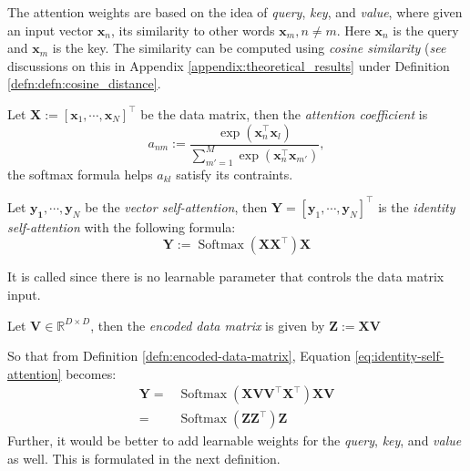 The attention weights are based on the idea of \textit{query}, \textit{key}, and \textit{value}, where given an input vector $\mathbf{x}_n$, its similarity to other words $\mathbf{x}_m,n\neq m$. Here $\mathbf{x}_n$ is the query and $\mathbf{x}_m$ is the key. The similarity can be computed using \textit{cosine similarity} (\textit{see} discussions on this in Appendix \ref{appendix:theoretical_results} under Definition \ref{defn:defn:cosine_distance}.
\begin{defn}
    Let $\mathbf{X}:=[\mathbf{x}_1,\cdots,\mathbf{x}_N]^{\top}$ be the data matrix, then the \textit{attention coefficient} is
    \begin{equation}
        a_{nm}:=\frac{\exp(\mathbf{x}_n^{\top}\mathbf{x}_l)}{\displaystyle\sum_{m'=1}^{M}\exp(\mathbf{x}_n^{\top}\mathbf{x}_{m'})},
    \end{equation}
    the softmax formula helps $a_{kl}$ satisfy its contraints.
\end{defn}
\begin{defn}
    Let $\mathbf{y_1},\cdots,\mathbf{y}_N$ be the \textit{vector self-attention}, then $\mathbf{Y}=[\mathbf{y}_1,\cdots,\mathbf{y}_N]^{\top}$ is the \textit{identity self-attention} with the following formula:
    \begin{equation}\label{eq:identity-self-attention}
        \mathbf{Y}:=\operatorname{Softmax}(\mathbf{X}\mathbf{X}^{\top})\mathbf{X}
    \end{equation}
\end{defn}
\begin{remark}
    It is called  since there is no learnable parameter that controls the data matrix input.
\end{remark}
\begin{defn}\label{defn:encoded-data-matrix}
    Let $\mathbf{V}\in\mathbb{R}^{D\times D}$, then the \textit{encoded data matrix} is given by $\mathbf{Z}:=\mathbf{X}\mathbf{V}$
\end{defn}
So that from Definition \ref{defn:encoded-data-matrix}, Equation \ref{eq:identity-self-attention} becomes:
\begin{align}
    \mathbf{Y}=&\operatorname{Softmax}(\mathbf{X}\mathbf{V}\mathbf{V}^{\top}\mathbf{X}^{\top})\mathbf{X}\mathbf{V}\\
    =&\operatorname{Softmax}(\mathbf{Z}\mathbf{Z}^{\top})\mathbf{Z}
\end{align}
Further, it would be better to add learnable weights for the \textit{query}, \textit{key}, and \textit{value} as well. This is formulated in the next definition.
